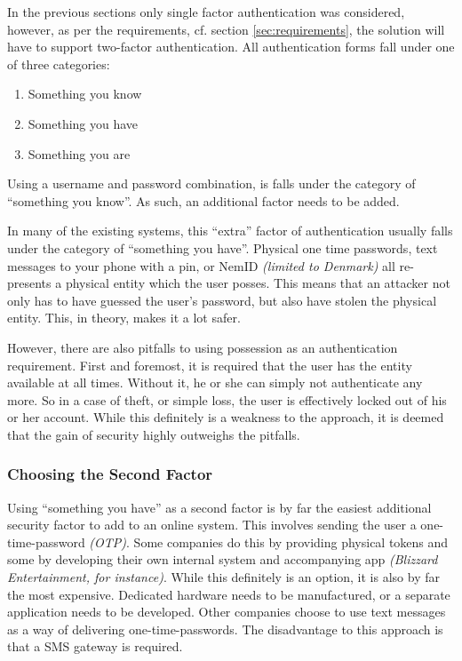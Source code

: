 			In the previous sections only single factor authentication was considered, however, as per the requirements, cf. section \ref{sec:requirements}, the solution will have to support two-factor authentication. All authentication forms fall under one of three categories:
			\begin{enumerate}
				\item Something you know
				\item Something you have
				\item Something you are
			\end{enumerate}
			Using a username and password combination, is falls under the category of ``something you know''. As such, an additional factor needs to be added. 

			In many of the existing systems, this ``extra'' factor of authentication usually falls under the category of ``something you have''. Physical one time passwords, text messages to your phone with a pin, or NemID \emph{(limited to Denmark)} all re-presents a physical entity which the user posses. This means that an attacker not only has to have guessed the user's password, but also have stolen the physical entity. This, in theory, makes it a lot safer.

			However, there are also pitfalls to using possession as an authentication requirement. First and foremost, it is required that the user has the entity available at all times. Without it, he or she can simply not authenticate any more. So in a case of theft, or simple loss, the user is effectively locked out of his or her account. While this definitely is a weakness to the approach, it is deemed that the gain of security highly outweighs the pitfalls.

			\subsubsection{Choosing the Second Factor}
				Using ``something you have'' as a second factor is by far the easiest additional security factor to add to an online system. This involves sending the user a one-time-password \emph{(OTP)}. Some companies do this by providing physical tokens and some by developing their own internal system and accompanying app \emph{(Blizzard Entertainment, for instance)}. While this definitely is an option, it is also by far the most expensive. Dedicated hardware needs to be manufactured, or a separate application needs to be developed. Other companies choose to use text messages as a way of delivering one-time-passwords. The disadvantage to this approach is that a SMS gateway is required.

